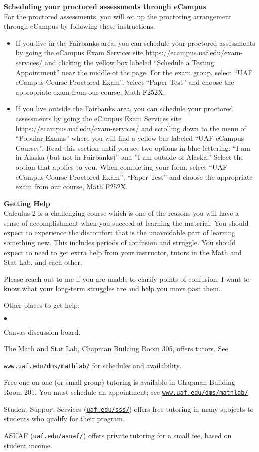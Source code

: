 \documentclass[12pt]{article}
\renewcommand{\emph}[1]{\textsf{\textbf{#1}}}
\newcommand{\localhead}[1]{\par\smallskip\textbf{#1} \smallskip\nobreak\\}%
\def\heading#1{\localhead{\large\emph{#1}}}
\newenvironment{clist}%
{\bgroup\parskip 0pt\begin{list}{$\bullet$}{\partopsep 4pt\topsep 0pt\itemsep -2pt}}%
{\end{list}\egroup}%
\begin{document}
\heading{Scheduling your proctored assessments through eCampus}
For the proctored assessments, you will set up the proctoring arrangement through eCampus by following these instructions.
\begin{itemize}
\item If you live in the Fairbanks area, you can schedule your proctored assessments by going
the eCampus Exam Services site \href{https://ecampus.uaf.edu/exam-services/}{https://ecampus.uaf.edu/exam-services/} and clicking
the yellow box labeled “Schedule a Testing Appointment” near the middle of the page.
For the exam group, select “UAF eCampus Course Proctored Exam”. Select “Paper Test”
and choose the appropriate exam from our course, Math F252X.
\item If you live outside the Fairbanks area, you can schedule your proctored assessments by
going the eCampus Exam Services site \href{https://ecampus.uaf.edu/exam-services/}{https://ecampus.uaf.edu/exam-services/} and
scrolling down to the menu of “Popular Exams” where you will find a yellow bar labeled
“UAF eCampus Courses”. Read this section until you see two options in blue lettering: “I
am in Alaska (but not in Fairbanks)” and ”I am outside of Alaska.” Select the option that
applies to you. When completing your form, select “UAF eCampus Course Proctored
Exam”, “Paper Test” and choose the appropriate exam from our course, Math F252X.
\end{itemize}
\heading{Getting Help}
Calculus 2 is a challenging course which is one of the reasons you will have a sense of accomplishment when you succeed at learning the material. You should expect to experience the discomfort that is the unavoidable part of learning something new. This includes periods of confusion and struggle. You should expect to need to get extra help from your instructor, tutors in the Math and Stat Lab, and each other. 

Please reach out to me if you are unable to clarify points of confusion. I want to know what your long-term struggles are and help you move past them.

Other places to get help: 

\begin{clist}
	\item Canvas discussion board.
    	\item The Math and Stat Lab, Chapman Building Room 305, offers tutors. 
	See 

	\href{http://www.uaf.edu/dms/mathlab/}{\texttt{www.uaf.edu/dms/mathlab/}} for schedules and availability.
	\item Free
one-on-one (or small group) tutoring is available in 
Chapman Building Room 201. You must schedule an
appointment; see \href{http://www.uaf.edu/dms/mathlab/}{\texttt{www.uaf.edu/dms/mathlab/}}.
	\item Student Support Services (\href{https://uaf.edu/sss/}{\texttt{uaf.edu/sss/}}) offers free tutoring in many subjects to students who qualify for their program.
	\item ASUAF (\href{https://uaf.edu/asuaf/}{\texttt{uaf.edu/asuaf/}}) offers private tutoring for a small fee, based on student income.
\end{clist}
\end{document}
